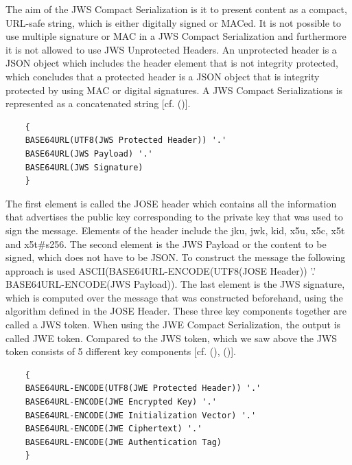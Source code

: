{{	The aim of the JWS Compact Serialization is it to present content as a compact, URL-safe string, which is either digitally signed or MACed. It is not possible to use multiple signature or MAC in a JWS Compact Serialization and furthermore it is not allowed to use JWS Unprotected Headers. An unprotected header is a JSON object which includes the header element that is not integrity protected, which concludes that a protected header is a JSON object that is integrity protected by using MAC or digital signatures. A JWS Compact Serializations is represented as a concatenated string [cf. (\cite{JWS:IETF:Jones:2015})].
	
	\begin{lstlisting}
	{
	BASE64URL(UTF8(JWS Protected Header)) '.'
	BASE64URL(JWS Payload) '.'
	BASE64URL(JWS Signature)
	}
	\end{lstlisting}
	
	The first element is called the JOSE header which contains all the information that advertises the public key corresponding to the private key that was used to sign the message. Elements of the header include the jku, jwk, kid, x5u, x5c, x5t and x5t\#s256. The second element is the JWS Payload or the content to be signed, which does not have to be JSON. To construct the message the following approach is used  ASCII(BASE64URL-ENCODE(UTF8(JOSE Header)) '.' BASE64URL-ENCODE(JWS Payload)). 
	The last element is the JWS signature, which is computed over the message that was constructed beforehand, using the algorithm defined in the JOSE Header. These three key components together are called a JWS token. When using the JWE Compact Serialization, the output is called JWE token. Compared to the JWS token, which we saw above the JWS token consists of 5 different key components [cf. (\cite{JWS:IETF:Jones:2015}), (\cite{JWE:IETF:Jones:2015})].
	
	
	\begin{lstlisting}
	{
	BASE64URL-ENCODE(UTF8(JWE Protected Header)) '.'
	BASE64URL-ENCODE(JWE Encrypted Key) '.'
	BASE64URL-ENCODE(JWE Initialization Vector) '.'
	BASE64URL-ENCODE(JWE Ciphertext) '.'
	BASE64URL-ENCODE(JWE Authentication Tag)
	}
	\end{lstlisting}
	
}}

